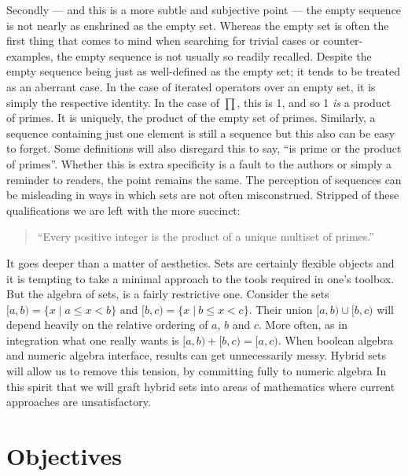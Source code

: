 Secondly --- and this is a more subtle and subjective point --- 
the empty sequence is not nearly as enshrined as the empty set.
Whereas the empty set is often the first thing that comes to mind when searching for trivial cases or counter-examples,
the empty sequence is not usually so readily recalled.
Despite the empty sequence being just as well-defined as the empty set; it tends to be treated as an aberrant case.
In the case of iterated operators over an empty set, it is simply the respective identity.
In the case of $\prod$, this is 1, and so 1 \emph{is} a product of primes.
It is uniquely, the product of the empty set of primes.
Similarly, a sequence containing just one element is still a sequence but this also can be easy to forget.
Some definitions will also disregard this to say, ``is prime or the product of primes''. 
Whether this is extra specificity is a fault to the authors or simply a reminder to readers, the point remains the same.
The perception of sequences can be misleading in ways in which sets are not often misconstrued.
Stripped of these qualifications we are left with the more succinct:
\begin{quote}
	``Every positive integer is the product of a unique multiset of primes.''
\end{quote}


It goes deeper than a matter of aesthetics. 
Sets are certainly flexible objects and it is tempting to take a minimal approach to the tools required in one's toolbox.
But the algebra of sets, is a fairly restrictive one.
Consider the sets $[a,b) = \{ x \; |\; a \leq x < b \}$ and $[b,c) = \{ x \;|\: b \leq x < c \}$.
Their union $[a,b) \cup [b,c)$ will depend heavily on the relative ordering of $a$, $b$ and $c$. 
More often, as in integration what one really wants is $[a,b) + [b,c) = [a,c)$.
When boolean algebra and numeric algebra interface, results can get unnecessarily messy.
Hybrid sets will allow us to remove this tension, by committing fully to numeric algebra
In this spirit that we will graft hybrid sets into areas of mathematics where current approaches are unsatisfactory.





\section{Objectives}


